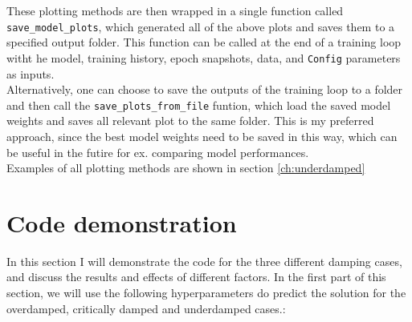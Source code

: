 \documentclass[we,twoside,openright,a4paper,11pt]{uantwerpenbamathesis}
\begin{document}
These plotting methods are then wrapped in a single function called \verb|save_model_plots|, which generated all of the above plots and saves them to a specified output folder. This function can be called at the end of a training loop witht he model, training history, epoch snapshots, data, and \verb|Config| parameters as inputs.\\

Alternatively, one can choose to save the outputs of the training loop to a folder and then call the \verb|save_plots_from_file| funtion, which load the saved model weights and saves all relevant plot to the same folder. This is my preferred approach, since the best model weights need to be saved in this way, which can be useful in the futire for ex. comparing model performances.\\

Examples of all plotting methods are shown in section \ref{ch:underdamped}

\section{Code demonstration}
In this section I will demonstrate the code for the three different damping cases, and discuss the results and effects of different factors. In the first part of this section, we will use the following hyperparameters do predict the solution for the overdamped, critically damped and underdamped cases.:
\end{document}
